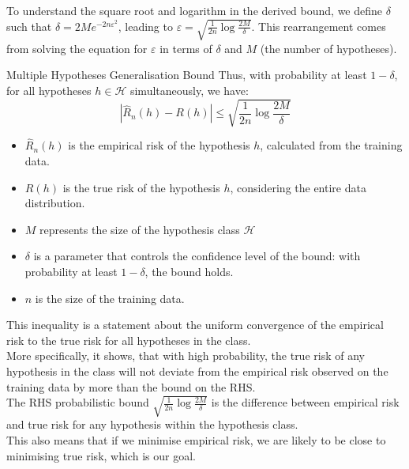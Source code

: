      To understand the square root and logarithm in the derived bound, we define \( \delta \) such that \( \delta = 2Me^{-2n\varepsilon^2} \), leading to \( \varepsilon = \sqrt{\frac{1}{2n}\log\frac{2M}{\delta}} \). This rearrangement comes from solving the equation for \( \varepsilon \) in terms of \( \delta \) and \( M \) (the number of hypotheses). \\


\begin{definitionbox}{Multiple Hypotheses Generalisation Bound}    
     Thus, with probability at least \( 1 - \delta \), for all hypotheses \( h \in \mathcal{H} \) simultaneously, we have:
    \[
    |\widehat{R}_n(h) - R(h)| \leq \sqrt{\frac{1}{2n}\log\frac{2M}{\delta}}
    \]
\begin{itemize}
    \item \( \widehat{R}_n(h) \) is the empirical risk of the hypothesis \( h \), calculated from the training data.
    \item \( R(h) \) is the true risk of the hypothesis \( h \), considering the entire data distribution.
    \item \( M \) represents the size of the hypothesis class \( \mathcal{H} \)
    \item \( \delta \) is a parameter that controls the confidence level of the bound: with probability at least \( 1 - \delta \), the bound holds.
    \item \( n \) is the size of the training data.
\end{itemize}

This inequality is a statement about the uniform convergence of the empirical risk to the true risk for all hypotheses in the class.\\

More specifically, it shows, that with high probability, the true risk of any hypothesis in the class will not deviate from the empirical risk observed on the training data by more than the bound on the RHS.\\

The RHS probabilistic bound $ \sqrt{\frac{1}{2n}\log\frac{2M}{\delta}}$ is the difference between empirical risk and true risk for any hypothesis within the hypothesis class.\\

This also means that if we minimise empirical risk, we are likely to be close to minimising true risk, which is our goal.


\end{definitionbox}



